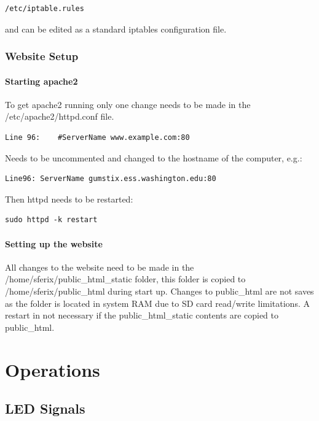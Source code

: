 \begin{verbatim}
/etc/iptable.rules
\end{verbatim}

and can be edited as a standard iptables configuration file.

\subsubsection{Website Setup}

\paragraph{Starting apache2}

To get apache2 running only one change needs to be made in the /etc/apache2/httpd.conf file.

\begin{verbatim}
Line 96:	#ServerName www.example.com:80
\end{verbatim}

Needs to be uncommented and changed to the hostname of the computer, e.g.:

\begin{verbatim}
Line96:	ServerName gumstix.ess.washington.edu:80
\end{verbatim}

Then httpd needs to be restarted:

\begin{verbatim}
sudo httpd -k restart
\end{verbatim}

\paragraph{Setting up the website}

All changes to the website need to be made in the /home/sferix/public\_html\_static folder, this folder is copied to /home/sferix/public\_html during start up. Changes to public\_html are not saves as the folder is located in system RAM due to SD card read/write limitations. A restart in not necessary if the public\_html\_static contents are copied to public\_html.

\clearpage

\section{Operations}

\subsection{LED Signals}

